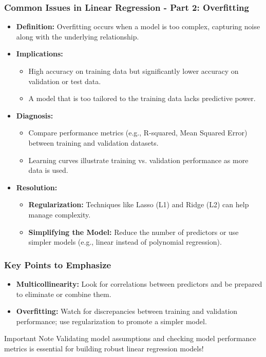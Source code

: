 \documentclass[aspectratio=169]{beamer}
\begin{document}
\begin{frame}[fragile]
    \frametitle{Common Issues in Linear Regression - Part 2: Overfitting}
    \begin{itemize}
        \item \textbf{Definition:} Overfitting occurs when a model is too complex, capturing noise along with the underlying relationship.
        \item \textbf{Implications:}
            \begin{itemize}
                \item High accuracy on training data but significantly lower accuracy on validation or test data.
                \item A model that is too tailored to the training data lacks predictive power.
            \end{itemize}
        \item \textbf{Diagnosis:}
            \begin{itemize}
                \item Compare performance metrics (e.g., R-squared, Mean Squared Error) between training and validation datasets.
                \item Learning curves illustrate training vs. validation performance as more data is used.
            \end{itemize}
        \item \textbf{Resolution:}
            \begin{itemize}
                \item \textbf{Regularization:} Techniques like Lasso (L1) and Ridge (L2) can help manage complexity.
                \item \textbf{Simplifying the Model:} Reduce the number of predictors or use simpler models (e.g., linear instead of polynomial regression).
            \end{itemize}
    \end{itemize}
\end{frame}

\begin{frame}[fragile]
    \frametitle{Key Points to Emphasize}
    \begin{itemize}
        \item \textbf{Multicollinearity:} Look for correlations between predictors and be prepared to eliminate or combine them.
        \item \textbf{Overfitting:} Watch for discrepancies between training and validation performance; use regularization to promote a simpler model.
    \end{itemize}
    \begin{block}{Important Note}
        Validating model assumptions and checking model performance metrics is essential for building robust linear regression models!
    \end{block}
\end{frame}
\end{document}
